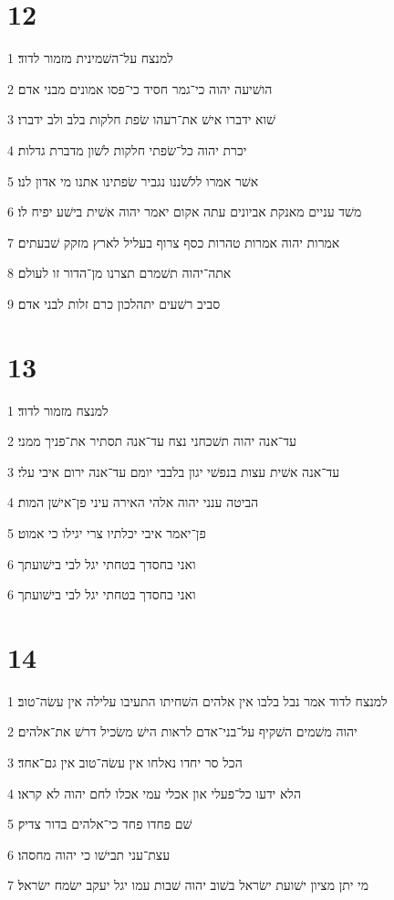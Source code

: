 \chapter{12}

\par 1 למנצח על־השׁמינית מזמור לדוד׃
\par 2 הושׁיעה יהוה כי־גמר חסיד כי־פסו אמונים מבני אדם׃
\par 3 שׁוא ידברו אישׁ את־רעהו שׂפת חלקות בלב ולב ידברו׃
\par 4 יכרת יהוה כל־שׂפתי חלקות לשׁון מדברת גדלות׃
\par 5 אשׁר אמרו ללשׁננו נגביר שׂפתינו אתנו מי אדון לנו׃
\par 6 משׁד עניים מאנקת אביונים עתה אקום יאמר יהוה אשׁית בישׁע יפיח לו׃
\par 7 אמרות יהוה אמרות טהרות כסף צרוף בעליל לארץ מזקק שׁבעתים׃
\par 8 אתה־יהוה תשׁמרם תצרנו מן־הדור זו לעולם׃
\par 9 סביב רשׁעים יתהלכון כרם זלות לבני אדם׃

\chapter{13}

\par 1 למנצח מזמור לדוד׃
\par 2 עד־אנה יהוה תשׁכחני נצח עד־אנה תסתיר את־פניך ממני׃
\par 3 עד־אנה אשׁית עצות בנפשׁי יגון בלבבי יומם עד־אנה ירום איבי עלי׃
\par 4 הביטה ענני יהוה אלהי האירה עיני פן־אישׁן המות׃
\par 5 פן־יאמר איבי יכלתיו צרי יגילו כי אמוט׃
\par 6 ואני בחסדך בטחתי יגל לבי בישׁועתך
\par 6 ואני בחסדך בטחתי יגל לבי בישׁועתך

\chapter{14}

\par 1 למנצח לדוד אמר נבל בלבו אין אלהים השׁחיתו התעיבו עלילה אין עשׂה־טוב׃
\par 2 יהוה משׁמים השׁקיף על־בני־אדם לראות הישׁ משׂכיל דרשׁ את־אלהים׃
\par 3 הכל סר יחדו נאלחו אין עשׂה־טוב אין גם־אחד׃
\par 4 הלא ידעו כל־פעלי און אכלי עמי אכלו לחם יהוה לא קראו׃
\par 5 שׁם פחדו פחד כי־אלהים בדור צדיק׃
\par 6 עצת־עני תבישׁו כי יהוה מחסהו׃
\par 7 מי יתן מציון ישׁועת ישׂראל בשׁוב יהוה שׁבות עמו יגל יעקב ישׂמח ישׂראל׃

